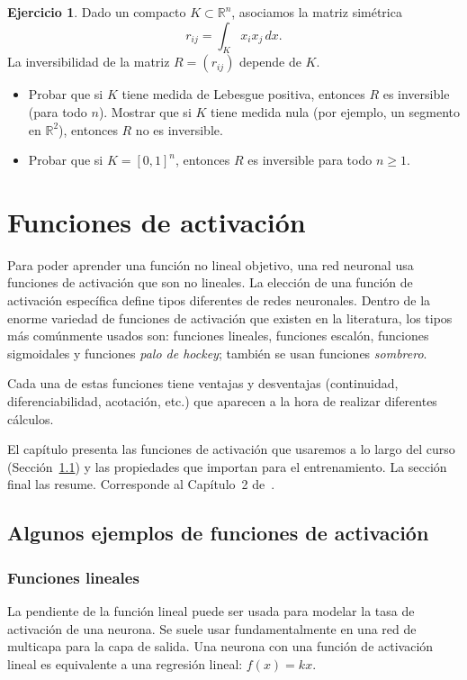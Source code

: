 \documentclass[12pt, a4paper]{amsbook}
\newcommand{\R}{{\mathbb R}}
\theoremstyle{remark}
\theoremstyle{definition}
\newtheorem{ejer}[teo]{Ejercicio}
\numberwithin{section}{chapter}
\numberwithin{subsection}{section}
\numberwithin{equation}{section}
\numberwithin{figure}{chapter}
\begin{document}
\begin{ejer}
Dado un compacto $K\subset \R^n$, asociamos la matriz simétrica
$$
r_{ij} = \int_K x_i x_j\, dx.
$$
La inversibilidad de la matriz $R=(r_{ij})$ depende de $K$.
\begin{itemize}
\item[(a)] Probar que si $K$ tiene medida de Lebesgue positiva, entonces $R$ es inversible (para todo $n$). Mostrar que si $K$ tiene medida nula (por ejemplo, un segmento en $\R^2$), entonces $R$ no es inversible.
\item[(b)] Probar que si $K=[0,1]^n$, entonces $R$ es inversible para todo $n\ge 1$.
\end{itemize}
\end{ejer}


\chapter{Funciones de activación}\label{cap2}

Para poder aprender una función no lineal objetivo, una red neuronal usa funciones de activación que son no lineales. La elección de una función de activación específica define tipos diferentes de redes neuronales. Dentro de la enorme variedad de funciones de activación que existen en la literatura, los tipos más comúnmente usados son: funciones lineales, funciones escalón, funciones sigmoidales y funciones {\em palo de hockey}; también se usan funciones {\em sombrero}.

Cada una de estas funciones tiene ventajas y desventajas (continuidad, diferenciabilidad, acotación, etc.) que aparecen a la hora de realizar diferentes cálculos.

El capítulo presenta las funciones de activación que usaremos a lo largo del curso (Sección~\ref{sec.c2.1}) y las propiedades que importan para el entrenamiento. La sección final las resume. Corresponde al Capítulo~2 de~\cite{Calin}.

\section{Algunos ejemplos de funciones de activación}\label{sec.c2.1}

\subsection*{Funciones lineales} La pendiente de la función lineal puede ser usada para modelar la tasa de activación de una neurona. Se suele usar fundamentalmente en una red de multicapa para la capa de salida. Una neurona con una función de activación lineal es equivalente a una regresión lineal: $f(x)=kx$.
\end{document}
